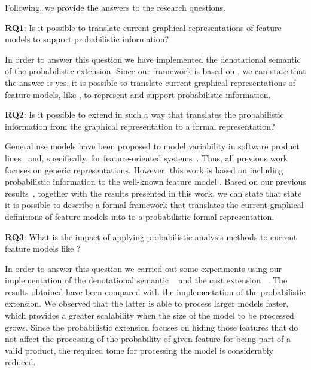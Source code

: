 Following, we provide the answers to the research questions.

\textbf{RQ1}: Is it possible to translate current graphical representations of feature models to
support probabilistic information?


In order to answer this question we have implemented the denotational semantic
of the probabilistic extension. Since our framework is based on \FODA, we
can state that the answer is yes, it is possible to translate current graphical
representations of feature models, like \FODA, to represent and support probabilistic
information.

\textbf{RQ2}: Is it possible to extend \fodaPA in such a way that
translates the probabilistic information from the graphical representation to a formal representation?

General use models have been proposed to model variability in software
product lines~\cite{tlll15, tllv15} and, specifically, for feature-oriented
systems~\cite{Dubslaff2015, Chrszon2018}.
Thus, all previous work focuses on
generic representations. However, this work is based on including probabilistic
information to the well-known feature model \FODA.
Based on our previous results~\cite{acl13,clc16}, together with the results
presented in this work, we can state that state it is possible to
describe a formal framework that translates the current graphical
definitions of feature models into to a probabilistic formal representation.

\textbf{RQ3}: What is the impact of applying probabilistic analysis methods
to current feature models like \FODA?

In order to answer this question we carried out some experiments using
our implementation of the denotational semantic \fodaPA~\cite{acl13}
and the cost extension \fodaPAc~\cite{clc16}. The results obtained
have been compared with the implementation of the probabilistic
extension. We observed that the latter is able to process larger
models faster, which provides a greater scalability when
the size of the model to be processed grows. Since the probabilistic extension
focuses on hiding  those features that do not affect the processing of the
probability of given feature for being part of a valid product, the required
tome for processing the model is considerably reduced.



